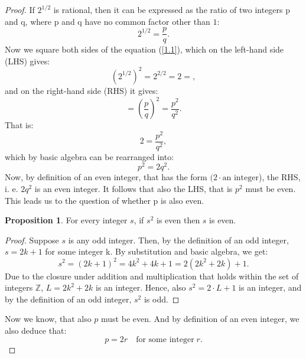 \documentclass[11pt]{amsart}
\theoremstyle{definition}
\newtheorem{proposition}{Proposition}
\begin{document}
\begin{proof}
If \(2^{1/2}\) is rational, then it can be expressed as the ratio of two integers p and q, where p and q have no common factor other than \(1\):
\begin{equation}\label{1.1}
    2^{1/2} = \frac{p}{q}.    
\end{equation}
Now we square both sides of the equation (\ref{1.1}), which on the left-hand side (LHS) gives: 
\begin{equation}\label{1.2}
    \left(2^{1/2}\right)^{2} = 2^{2/2} = 2 =,
\end{equation}
and on the right-hand side (RHS) it gives: 
\begin{equation}\label{1.3}
    = \left(\frac{p}{q}\right)^{2} = \frac{p^2}{q^2}.
\end{equation}
That is:
\begin{equation}\label{1.4}
    2 = \frac{p^2}{q^2},
\end{equation}
which by basic algebra can be rearranged into: 
\begin{equation}\label{1.5}
    p^{2} = 2q^{2}.
\end{equation}
Now, by definition of an even integer, that has the form \((2 \cdot \text{an integer}\)), the RHS, i. e. \(2q^{2}\) is an even integer. It follows that also the LHS, that is \(p^{2}\) must be even. This leads us to the question of whether p is also even.
\begin{proposition}\label{2.1}
For every integer \(s\), if \(s^{2}\) is even then \(s\) is even.
\end{proposition}
\begin{proof}\renewcommand{\qedsymbol}{}
    Suppose \(s\) is any odd integer. Then, by the definition of an odd integer, \(s = 2k + 1\) for some integer k. By substitution and basic algebra, we get:
    \begin{equation}
        s^{2} = (2k + 1)^{2} = 4k^{2} + 4k + 1 = 2(2k^{2} + 2k) + 1.
    \end{equation}
    Due to the closure under addition and multiplication that holds within the set of integers \(\mathbb{Z}\), \(L = 2k^{2} + 2k\) is an integer. Hence, also \(s^{2} = 2 \cdot L + 1\) is an integer, and by the definition of an odd integer, \(s^{2}\) is odd.
\end{proof}
Now we know, that also \(p\) must be even. And by definition of an even integer, we also deduce that: 
\begin{equation}\label{1.6}
    p = 2r \quad \text{for some integer} \; r. 

\end{equation}
\end{proof}
\end{document}
